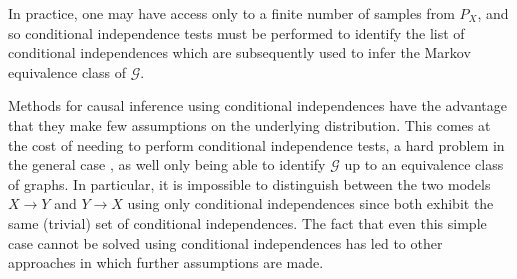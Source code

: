 In practice, one may have access only to a finite number of samples from $P_X$, and so conditional independence tests must be performed to identify the list of conditional independences which are subsequently used to infer the Markov equivalence class of $\mathcal{G}$.

Methods for causal inference using conditional independences have the advantage that they make few assumptions on the underlying distribution.
This comes at the cost of needing to perform conditional independence tests, a hard problem in the general case \citep{shah2018hardness}, as well only being able to identify $\mathcal{G}$ up to an equivalence class of graphs. 
In particular, it is impossible to distinguish between the two models $X \to Y$ and $Y \to X$ using only conditional independences since both exhibit the same (trivial) set of conditional independences.
The fact that even this simple case cannot be solved using conditional independences has led to other approaches in which further assumptions are made.

